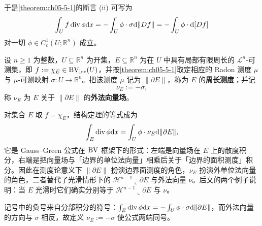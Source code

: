 \documentclass[../../main.tex]{subfiles}%
\begin{document}
于是\cref{theorem:ch05-5-1}的断言 (ii) 可写为%
\begin{align*}
\int_U f\operatorname{div}\phi\mathrm{d} x=-\int_U\phi\cdot\sigma\mathrm{d}\lVert Df\rVert=-\int_U\phi\cdot\mathrm{d}[Df]
\end{align*}
对一切 $\phi\in C_c^1(U;\mathbb{R}^n)$ 成立。

\begin{definition*}[周长测度的记号]\label{definition:ch05-def-5-1-周长测度}
设 $n\geqslant1$ 为整数，$U\subseteq\mathbb{R}^n$ 为开集，$E\subseteq\mathbb{R}^n$ 为在 $U$ 中具有局部有限周长的 $\mathcal{L}^n$-可测集，即 $f:=\chi_E\in\mathrm{BV}_{\mathrm{loc}}(U)$，并按\cref{theorem:ch05-5-1}取定相应的 Radon 测度 $\mu$ 与 $\mu$-可测映射 $\sigma:U\to\mathbb{R}^n$。把该测度 $\mu$ 记为 $\lVert\partial E\rVert$，称为 $E$ 的\textbf{周长测度}；并记 %
\begin{align*}
\nu_E:=-\sigma,
\end{align*}
称 $\nu_E$ 为 $E$ 关于 $\lVert\partial E\rVert$ 的\textbf{外法向量场}。
\end{definition*}

\begin{remark}\label{remark:ch05-def-5-1-周长测度-动机}
对集合 $E$ 取 $f=\chi_E$，结构定理的等式成为
\begin{align*}
\int_E\operatorname{div}\phi\mathrm{d} x=\int_U\phi\cdot\nu_E\mathrm{d}\lVert\partial E\rVert,
\end{align*}
它是 Gauss--Green 公式在 $\mathrm{BV}$ 框架下的形式：左端是向量场在 $E$ 上的散度积分，右端是把向量场与「边界的单位法向量」相乘后关于「边界的面积测度」积分。因此在测度论意义下 $\lVert\partial E\rVert$ 扮演边界面测度的角色，$\nu_E$ 扮演外单位法向量的角色，二者替代了光滑情形下的 $\mathcal{H}^{n-1}\llcorner\partial E$ 与外法向量 $\nu$。后文的两个例子说明：当 $E$ 光滑时它们确实分别等于 $\mathcal{H}^{n-1}\llcorner\partial E$ 与 $\nu$。%

记号中的负号来自分部积分的符号：$\int_E\operatorname{div}\phi\mathrm{d} x=-\int_U\phi\cdot\sigma\mathrm{d}\lVert\partial E\rVert$，而外法向量的方向与 $\sigma$ 相反，故定义 $\nu_E:=-\sigma$ 使公式两端同号。
\end{remark}
\end{document}
